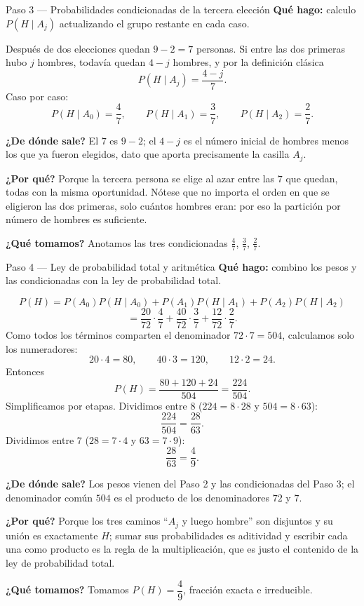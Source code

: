 \documentclass[11pt]{article}
\begin{document}
\begin{paso}{Paso 3 --- Probabilidades condicionadas de la tercera elección}
\textbf{Qué hago:} calculo $P(H\mid A_j)$ actualizando el grupo restante en cada caso.

Después de dos elecciones quedan $9-2=7$ personas. Si entre las dos primeras hubo $j$ hombres, todavía quedan $4-j$ hombres, y por la definición clásica
\[
P(H\mid A_j)=\frac{4-j}{7}.
\]
Caso por caso:
\[
P(H\mid A_0)=\frac{4}{7},
\qquad
P(H\mid A_1)=\frac{3}{7},
\qquad
P(H\mid A_2)=\frac{2}{7}.
\]

\textbf{¿De dónde sale?} El $7$ es $9-2$; el $4-j$ es el número inicial de hombres menos los que ya fueron elegidos, dato que aporta precisamente la casilla $A_j$.

\textbf{¿Por qué?} Porque la tercera persona se elige al azar entre las $7$ que quedan, todas con la misma oportunidad. Nótese que no importa el orden en que se eligieron las dos primeras, solo cuántos hombres eran: por eso la partición por número de hombres es suficiente.

\textbf{¿Qué tomamos?} Anotamos las tres condicionadas $\tfrac47$, $\tfrac37$, $\tfrac27$.
\end{paso}

\begin{paso}{Paso 4 --- Ley de probabilidad total y aritmética}
\textbf{Qué hago:} combino los pesos y las condicionadas con la ley de probabilidad total.

\[
P(H)=P(A_0)P(H\mid A_0)+P(A_1)P(H\mid A_1)+P(A_2)P(H\mid A_2)
\]
\[
=\frac{20}{72}\cdot\frac{4}{7}+\frac{40}{72}\cdot\frac{3}{7}+\frac{12}{72}\cdot\frac{2}{7}.
\]
Como todos los términos comparten el denominador $72\cdot 7=504$, calculamos solo los numeradores:
\[
20\cdot 4=80,
\qquad
40\cdot 3=120,
\qquad
12\cdot 2=24 .
\]
Entonces
\[
P(H)=\frac{80+120+24}{504}=\frac{224}{504}.
\]
Simplificamos por etapas. Dividimos entre $8$ ($224=8\cdot 28$ y $504=8\cdot 63$):
\[
\frac{224}{504}=\frac{28}{63}.
\]
Dividimos entre $7$ ($28=7\cdot 4$ y $63=7\cdot 9$):
\[
\frac{28}{63}=\frac{4}{9}.
\]

\textbf{¿De dónde sale?} Los pesos vienen del Paso 2 y las condicionadas del Paso 3; el denominador común $504$ es el producto de los denominadores $72$ y $7$.

\textbf{¿Por qué?} Porque los tres caminos ``$A_j$ y luego hombre'' son disjuntos y su unión es exactamente $H$; sumar sus probabilidades es aditividad y escribir cada una como producto es la regla de la multiplicación, que es justo el contenido de la ley de probabilidad total.

\textbf{¿Qué tomamos?} Tomamos $P(H)=\dfrac{4}{9}$, fracción exacta e irreducible.
\end{paso}
\end{document}
